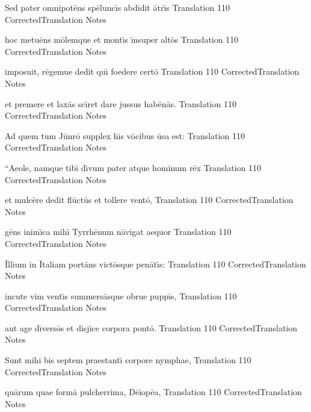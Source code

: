 \documentclass[]{article}
\begin{document}
\latline
  {Sed pater omnipot\={\macron e}ns sp\={\macron e}lunc\={\macron \i}s abdidit \={\macron a}tr\={\macron \i}s
}
  { Translation }
  {110}
  { CorrectedTranslation }
  { Notes }


\latline
  {hoc metu\={\macron e}ns m\={\macron o}lemque et mont\={\macron \i}s \={\macron \i}nsuper alt\={\macron o}s
}
  { Translation }
  {110}
  { CorrectedTranslation }
  { Notes }


\latline
  {imposuit, r\={\macron e}gemue dedit qu\={\macron \i} foedere cert\={\macron o}
}
  { Translation }
  {110}
  { CorrectedTranslation }
  { Notes }


\latline
  {et premere et lax\={\macron a}s sc\={\macron \i}ret dare jussus hab\={\macron e}n\={\macron a}s.
}
  { Translation }
  {110}
  { CorrectedTranslation }
  { Notes }


\latline
  {Ad quem tum J\={\macron u}nr\={\macron o} supplex h\={\macron \i}s v\={\macron o}cibus \={\macron u}sa est:
}
  { Translation }
  {110}
  { CorrectedTranslation }
  { Notes }


\latline
  {``Aeole, namque tib\={\macron \i} d\={\macron \i}vum pater atque hominum r\={\macron e}x
}
  { Translation }
  {110}
  { CorrectedTranslation }
  { Notes }


\latline
  {et mulc\={\macron e}re dedit fl\={\macron u}ct\={\macron u}s et tollere vent\={\macron o},
}
  { Translation }
  {110}
  { CorrectedTranslation }
  { Notes }


\latline
  {g\={\macron e}ns inim\={\macron \i}ca mih\={\macron \i} Tyrrh\={\macron e}num n\={\macron a}vigat aequor
}
  { Translation }
  {110}
  { CorrectedTranslation }
  { Notes }


\latline
  {\={\macron I}llium in \={\macron I}taliam port\={\macron a}ns vict\={\macron o}sque pen\={\macron a}t\={\macron \i}s:
}
  { Translation }
  {110}
  { CorrectedTranslation }
  { Notes }


\latline
  {incute vim vent\={\macron \i}s summers\={\macron a}sque obrue pupp\={\macron \i}s,
}
  { Translation }
  {110}
  { CorrectedTranslation }
  { Notes }


\latline
  {aut age d\={\macron \i}vers\={\macron o}s et disjice corpora pont\={\macron o}.
}
  { Translation }
  {110}
  { CorrectedTranslation }
  { Notes }


\latline
  {Sunt mihi bis septem praestant\={\macron \i} corpore nymphae,
}
  { Translation }
  {110}
  { CorrectedTranslation }
  { Notes }


\latline
  {qu\={\macron a}rum quae form\={\macron a} pulcherrima, D\={\macron e}iop\={\macron e}a,
}
  { Translation }
  {110}
  { CorrectedTranslation }
  { Notes }
\end{document}
